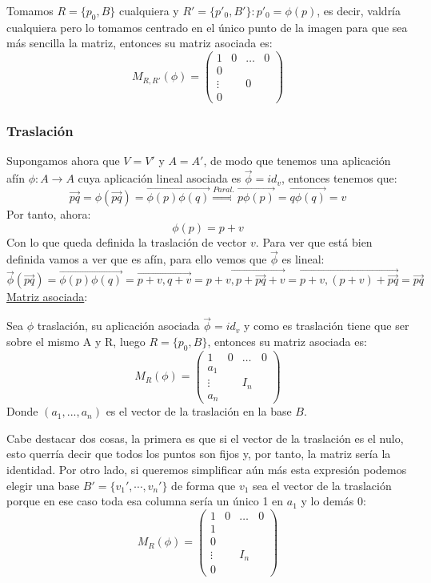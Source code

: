 \documentclass[10pt,a4paper,openright]{book}
\begin{document}
Tomamos $R = \{p_0, B\}$ cualquiera y $R' = \{p'_0, B'\}: p'_0 = \phi (p)$, es decir, valdría cualquiera pero lo tomamos centrado en el único punto de la imagen para que sea más sencilla la matriz, entonces su matriz asociada es:
$$M_{R, R'} (\phi) = \left(\begin{array}{c|ccc}
1  & 0 & \ldots & 0 \\
\hline
0  &  & & \\
\vdots &  & 0 & \\
0 & & &
\end{array}
\right)$$

\subsubsection*{Traslación}
Supongamos ahora que $V=V'$ y $A=A'$, de modo que tenemos una aplicación afín $\phi: A\rightarrow A$ cuya aplicación lineal asociada es $\vec{\phi} = id_v$, entonces tenemos que:
$$\vec{pq} = \phi(\vec{pq}) = \overrightarrow{\phi(p)\phi(q)}\stackrel{Paral.}{\Rightarrow} \overrightarrow{p\phi(p)} = \overrightarrow{q\phi(q)} = v$$
Por tanto, ahora:
$$\phi(p) = p +v$$
Con lo que queda definida la traslación de vector $v$. Para ver que está bien definida vamos a ver que es afín, para ello vemos que $\vec{\phi}$ es lineal:
$$\vec{\phi}(\vec{pq}) = \overrightarrow{\phi(p)\phi(q)} = \overrightarrow{p+v, q+v} =\overrightarrow{p+v, p+ \vec{pq}+v} = \overrightarrow{p+v, (p+v)+ \vec{pq}} = \vec{pq}$$
\underline{Matriz asociada}:

Sea $\phi$ traslación, su aplicación asociada $\vec{\phi} = id_v$ y como es traslación tiene que ser sobre el mismo A y R, luego $R = \{p_0, B\} $, entonces su matriz asociada es:
$$M_{R} (\phi) = \left(\begin{array}{c|ccc}
1  & 0 & \ldots & 0 \\
\hline
a_1  &  & & \\
\vdots &  & I_n & \\
a_n & & &
\end{array}
\right)$$
Donde $(a_1, ..., a_n)$ es el vector de la traslación en la base $B$.

Cabe destacar dos cosas, la primera es que si el vector de la traslación es el nulo, esto querría decir que todos los puntos son fijos y, por tanto, la matriz sería la identidad. Por otro lado, si queremos simplificar aún más esta expresión podemos elegir una base $B'=\{v_1', \cdots, v_n'\}$ de forma que $v_1$ sea el vector de la traslación porque en ese caso toda esa columna sería un único 1 en $a_1$ y lo demás 0:
$$M_{R} (\phi) = \left(\begin{array}{c|ccc}
1  & 0 & \ldots & 0 \\
\hline
1  &  & & \\
0 & & & \\
\vdots &  & I_n & \\
0 & & &
\end{array}
\right)$$
\end{document}
